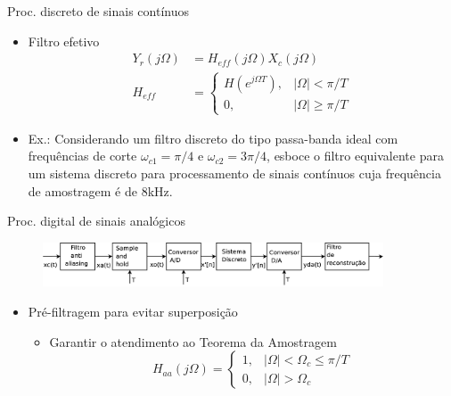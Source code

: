 \begin{slide}{Proc. discreto de sinais cont\'inuos}
\begin{itemize}
   \item Filtro efetivo
   \begin{align}
      Y_r(j\Omega)   &= H_{eff}(j\Omega)X_c(j\Omega)\\
      H_{eff}        &= \begin{cases} H(e^{j\Omega T}), & |\Omega|<\pi /T \\
                                      0,                & |\Omega|\geq\pi /T
                        \end{cases}
   \end{align}
   \item Ex.: Considerando um filtro discreto do tipo passa-banda ideal com frequ\^encias de corte $\omega_{c1}=\pi/4$ e $\omega_{c2}=3\pi/4$, esboce o filtro equivalente para um sistema discreto para processamento de sinais cont\'inuos cuja frequ\^encia de amostragem \'e de $8$kHz. 
\end{itemize}
\end{slide}

\begin{slide}{Proc. digital de sinais anal\'ogicos}
 \begin{figure}
      \centering
      \includegraphics[width=0.9\textwidth]{figs/diagrama_completo.eps}
   \end{figure}
\begin{itemize}
   \item Pré-filtragem para evitar superposição
   \begin{itemize}
      \item Garantir o atendimento ao Teorema da Amostragem
      \begin{equation}
         H_{aa}(j\Omega) = \begin{cases}1, & |\Omega|<\Omega_c\leq \pi/T \\ 0, & |\Omega|>\Omega_c                          \end{cases}
      \end{equation}
   \end{itemize}
\end{itemize}
\end{slide}

